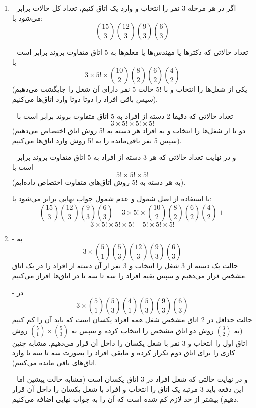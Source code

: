 \begin{enumerate}

    \item
    -
    اگر در هر مرحله 3 نفر را انتخاب و وارد یک اتاق کنیم، تعداد کل حالات برابر می‌شود با: 
    $$\binom{15}{3}\binom{12}{3}\binom{9}{3}\binom{6}{3}$$

    -
    تعداد حالاتی که دکترها یا مهندس‌ها یا معلم‌ها به 5 اتاق متفاوت بروند برابر است با
    $$3\times5!\times\binom{10}{2}\binom{8}{2}\binom{6}{2}\binom{4}{2}$$
    (یکی از شغل‌ها را انتخاب و با !5 حالت 5 نفر دارای آن شغل را جایگشت می‌دهیم سپس باقی افراد را دو‌تا دو‌تا وارد اتاق‌ها می‌کنیم).

    -
    تعداد حالاتی که دقیقا 2 دسته از افراد به 5 اتاق متفاوت بروند برابر است با
    $$3\times5!\times5!\times5!$$
    (دو تا از شغل‌ها را انتخاب و به افراد هر دسته به !5 روش اتاق اختصاص می‌دهیم سپس 5 نفر باقی‌مانده را به !5 روش وارد اتاق‌ها می‌کنیم).

    -
    و در نهایت تعداد حالاتی که هر 3 دسته از افراد به 5 اتاق متفاوت بروند برابر
    است با
    $$5!\times5!\times5!$$
    (به هر دسته به !5 روش اتاق‌های متفاوت اختصاص داده‌ایم).

    با استفاده از اصل شمول و عدم شمول جواب نهایی برابر می‌شود با:
    $$\binom{15}{3}\binom{12}{3}\binom{9}{3}\binom{6}{3}-3\times5!\times\binom{10}{2}\binom{8}{2}\binom{6}{2}\binom{4}{2}+$$
    $$3\times5!\times5!\times5!-5!\times5!\times5!$$

    \item
    -
    به
    $$3\times\binom{5}{1}\binom{5}{3}\binom{12}{3}\binom{9}{3}\binom{6}{3}$$
    حالت یک دسته از 3 شغل را انتخاب و 3 نفر از آن دسته از افراد را در یک اتاق مشخص قرار می‌دهیم و سپس بقیه افراد را سه تا سه تا در اتاق‌ها افراز می‌کنیم.

    -
    در 
    $$3\times\binom{5}{1}\binom{5}{3}\binom{4}{1}\binom{5}{3}\binom{9}{3}\binom{6}{3}$$
    حالت حداقل در 2 اتاق مشخص شغل همه افراد یکسان است که باید آن را کم کنیم (به
    $\binom{3}{2}$
    روش دو اتاق مشخص را انتخاب کرده و سپس به 
    $\binom{5}{1}\times\binom{5}{3}$
    روش اتاق اول را انتخاب و 3 نفر با شغل یکسان را داخل آن قرار می‌دهیم. مشابه چنین کاری را برای اتاق دوم تکرار کرده و مابقی افراد را بصورت سه تا سه تا وارد اتاق‌های باقی مانده می‌کنیم).

    -
    و در نهایت حالتی که شغل افراد در 3 اتاق یکسان است (مشابه حالت پیشین اما این دفعه باید 3 مرتبه یک اتاق را انتخاب و افراد با شغل یکسان را داخل آن قرار دهیم) بیشتر از حد لازم کم شده است که آن را به جواب نهایی اضافه می‌کنیم.
    

\end{enumerate}
